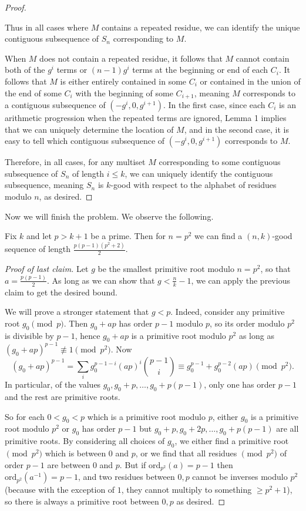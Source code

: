 \documentclass[11pt]{scrartcl}
\begin{document}
\begin{proof}
\begin{itemize}
\end{itemize}
Thus in all cases where $M$ contains a repeated residue, we can identify the unique contiguous subsequence of $S_n$ corresponding to $M$.

When $M$ does not contain a repeated residue, it follows that $M$ cannot contain both of the $g^i$ terms or $(n-1)g^i$ terms at the beginning or end of each $C_i$. It follows that $M$ is either entirely contained in some $C_i$ or contained in the union of the end of some $C_i$ with the beginning of some $C_{i+1}$, meaning $M$ corresponds to a contiguous subsequence of $(-g^i, 0, g^{i+1})$. In the first case, since each $C_i$ is an arithmetic progression when the repeated terms are ignored, Lemma 1 implies that we can uniquely determine the location of $M$, and in the second case, it is easy to tell which contiguous subsequence of $(-g^i, 0, g^{i+1})$ corresponds to $M$.

Therefore, in all cases, for any multiset $M$ corresponding to some contiguous subsequence of $S_n$ of length $i\le k$, we can uniquely identify the contiguous subsequence, meaning $S_n$ is $k$-good with respect to the alphabet of residues modulo $n$, as desired.
\end{proof}

Now we will finish the problem. We observe the following.

\begin{claim*}
Fix $k$ and let $p>k+1$ be a prime. Then for $n=p^2$ we can find a $(n,k)$-good sequence of length $\frac{p(p-1)(p^2+2)}{2}$.
\end{claim*}
\begin{proof}
  [Proof of last claim]
Let $g$ be the smallest primitive root modulo $n=p^2$, so that $a = \frac{p(p-1)}{2}$. As long as we can show that $g < \frac{n}{k}-1$, we can apply the previous claim to get the desired bound.

We will prove a stronger statement that $g<p$. Indeed, consider any primitive root $g_0 \pmod p$. Then $g_0+ap$ has order $p-1$ modulo $p$, so its order modulo $p^2$ is divisible by $p-1$, hence $g_0+ap$ is a primitive root modulo $p^2$ as long as $(g_0+ap)^{p-1}\not\equiv 1\pmod {p^2}$. Now \[(g_0 + ap)^{p-1} = \sum_i g_0^{p-1-i}(ap)^i \binom{p-1}{i} \equiv g_0^{p-1} + g_0^{p-2}(ap) \pmod {p^2}.\] In particular, of the values $g_0, g_0+p, \dots, g_0+p(p-1)$, only one has order $p-1$ and the rest are primitive roots.

So for each $0<g_0<p$ which is a primitive root modulo $p$, either $g_0$ is a primitive root modulo $p^2$ or $g_0$ has order $p-1$ but $g_0+p, g_0+2p, \dots, g_0+p(p-1)$ are all primitive roots. By considering all choices of $g_0$, we either find a primitive root $\pmod {p^2}$ which is between $0$ and $p$, or we find that all residues $\pmod {p^2}$ of order $p-1$ are between $0$ and $p$. But if $\text{ord}_{p^2} (a) = p-1$ then $\text{ord}_{p^2} (a^{-1}) = p-1$, and two residues between $0,p$ cannot be inverses modulo $p^2$ (because with the exception of $1$, they cannot multiply to something $\ge p^2+1$), so there is always a primitive root between $0,p$ as desired.
\end{proof}
\end{document}
